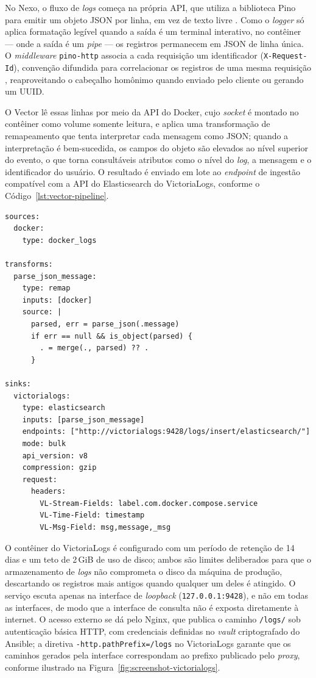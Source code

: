 No Nexo, o fluxo de \textit{logs} começa na própria API, que utiliza a
biblioteca Pino para emitir um objeto JSON por linha, em vez de texto livre
\citep{pino:2026}. Como o \textit{logger} só aplica formatação legível quando a
saída é um terminal interativo, no contêiner --- onde a saída é um
\textit{pipe} --- os registros permanecem em JSON de linha única. O
\textit{middleware} \texttt{pino-http} associa a cada requisição um
identificador (\texttt{X-Request-Id}), convenção difundida para correlacionar
os registros de uma mesma requisição \citep{heroku:2026}, reaproveitando o
cabeçalho homônimo quando enviado pelo cliente ou gerando um UUID.

O Vector lê essas linhas por meio da API do Docker, cujo \textit{socket} é
montado no contêiner como volume somente leitura, e aplica uma transformação de
remapeamento que tenta interpretar cada mensagem como JSON; quando a
interpretação é bem-sucedida, os campos do objeto são elevados ao nível
superior do evento, o que torna consultáveis atributos como o nível do
\textit{log}, a mensagem e o identificador do usuário. O resultado é enviado em
lote ao \textit{endpoint} de ingestão compatível com a API do Elasticsearch do
VictoriaLogs, conforme o Código~\ref{lst:vector-pipeline}.

\begin{lstlisting}[caption={Configuração do \textit{pipeline} de \textit{logs} no \texttt{vector.yaml}}, label={lst:vector-pipeline}]
sources:
  docker:
    type: docker_logs

transforms:
  parse_json_message:
    type: remap
    inputs: [docker]
    source: |
      parsed, err = parse_json(.message)
      if err == null && is_object(parsed) {
        . = merge(., parsed) ?? .
      }

sinks:
  victorialogs:
    type: elasticsearch
    inputs: [parse_json_message]
    endpoints: ["http://victorialogs:9428/logs/insert/elasticsearch/"]
    mode: bulk
    api_version: v8
    compression: gzip
    request:
      headers:
        VL-Stream-Fields: label.com.docker.compose.service
        VL-Time-Field: timestamp
        VL-Msg-Field: msg,message,_msg
\end{lstlisting}


O contêiner do VictoriaLogs é configurado com um período de retenção de 14
dias e um teto de 2\,GiB de uso de disco; ambos são limites deliberados para
que o armazenamento de \textit{logs} não comprometa o disco da máquina de
produção, descartando os registros mais antigos quando qualquer um deles é
atingido. O serviço escuta apenas na interface de \textit{loopback}
(\texttt{127.0.0.1:9428}), e não em todas as interfaces, de modo que a
interface de consulta não é exposta diretamente à internet. O acesso externo
se dá pelo Nginx, que publica o caminho \texttt{/logs/} sob autenticação
básica HTTP, com credenciais definidas no \textit{vault} criptografado do
Ansible; a diretiva \texttt{-http.pathPrefix=/logs} no VictoriaLogs garante
que os caminhos gerados pela interface correspondam ao prefixo publicado
pelo \textit{proxy}, conforme ilustrado na
Figura~\ref{fig:screenshot-victorialogs}.

